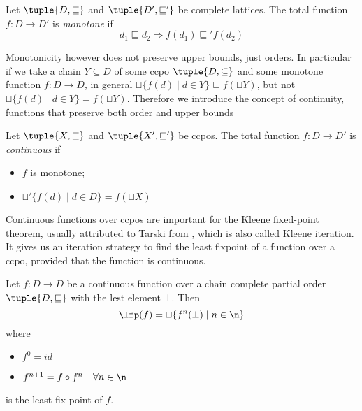 \begin{definition}
  Let \(\tuple{D, \sqsubseteq}\) and \(\tuple{D', \sqsubseteq'}\) be
  complete lattices. The total function \(f : D \to D'\) is
  \emph{monotone} if
  \begin{equation*}
    d_1 \sqsubseteq d_2 \Rightarrow f(d_1) \sqsubseteq' f(d_2)
  \end{equation*}
\end{definition}


Monotonicity however does not preserve upper bounds, just orders. In
particular if we take a chain \(Y \subseteq D\) of some ccpo
\(\tuple{D, \subseteq}\) and some monotone function \(f : D \to D\),
in general \(\sqcup\{f(d) \mid d \in Y\} \sqsubseteq f(\sqcup Y)\),
but not \(\sqcup\{f(d) \mid d \in Y\} = f(\sqcup Y)\). Therefore we
introduce the concept of continuity, functions that preserve both
order and upper bounds

\begin{definition}
  Let \(\tuple{X, \sqsubseteq}\) and \(\tuple{X', \sqsubseteq'}\) be
  ccpos. The total function \(f : D \to D'\) is \emph{continuous} if
  \begin{itemize}
  \item \(f\) is monotone;
  \item \(\sqcup'\{f(d) \mid d \in D\} = f(\sqcup X)\)
  \end{itemize}
\end{definition}

Continuous functions over ccpos are important for the Kleene
fixed-point theorem, usually attributed to Tarski from
\cite{tarski1955lattice}, which is also called Kleene iteration. It
gives us an iteration strategy to find the least fixpoint of a
function over a ccpo, provided that the function is continuous.

\begin{theorem}\label{th:fixpoint}
  Let \(f : D \to D\) be a continuous function over a chain complete
  partial order \(\tuple{D , \sqsubseteq}\) with the lest element
  \(\bot\). Then
  \begin{equation*}
    \lfp(f) = \sqcup\{f^n(\bot) \mid n \in \n\}
  \end{equation*}
  where
  \begin{itemize}
  \item \(f^0 = id\)
  \item \(f^{n+1} = f \circ f^n \quad \forall n \in \n\)
  \end{itemize}
  is the least fix point of \(f\).
\end{theorem}
